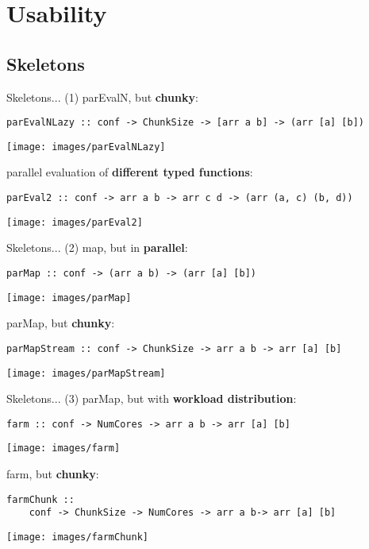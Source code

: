 \section{Usability}
\subsection{Skeletons}
\begin{frame}[fragile]{Skeletons... (1)}
parEvalN, but \textbf{chunky}:
\begin{lstlisting}[frame=htrbl]
parEvalNLazy :: conf -> ChunkSize -> [arr a b] -> (arr [a] [b])
\end{lstlisting}
\begin{center}
\texttt{[image: images/parEvalNLazy]}
\end{center}
parallel evaluation of \textbf{different typed functions}:
\begin{lstlisting}[frame=htrbl]
parEval2 :: conf -> arr a b -> arr c d -> (arr (a, c) (b, d))
\end{lstlisting}
\begin{center}
\texttt{[image: images/parEval2]}
\end{center}
\end{frame}
\begin{frame}[fragile]{Skeletons... (2)}
map, but in \textbf{parallel}:
\begin{lstlisting}[frame=htrbl]
parMap :: conf -> (arr a b) -> (arr [a] [b])
\end{lstlisting}
\begin{center}
\texttt{[image: images/parMap]}
\end{center}
parMap, but \textbf{chunky}:
\begin{lstlisting}[frame=htrbl]
parMapStream :: conf -> ChunkSize -> arr a b -> arr [a] [b]
\end{lstlisting}
\begin{center}
\texttt{[image: images/parMapStream]}
\end{center}
\end{frame}
\begin{frame}[fragile]{Skeletons... (3)}
parMap, but with \textbf{workload distribution}:
\begin{lstlisting}[frame=htrbl]
farm :: conf -> NumCores -> arr a b -> arr [a] [b]
\end{lstlisting}
\begin{center}
\texttt{[image: images/farm]}
\end{center}
farm, but \textbf{chunky}:
\begin{lstlisting}[frame=htrbl]
farmChunk ::
	conf -> ChunkSize -> NumCores -> arr a b-> arr [a] [b]
\end{lstlisting}
\begin{center}
\texttt{[image: images/farmChunk]}
\end{center}
\end{frame}